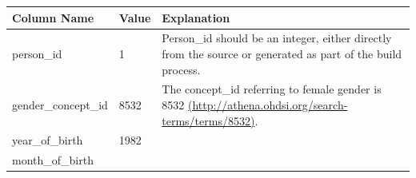 \documentclass[]{book}
\begin{document}
\begin{longtable}[]{@{}lll@{}}
\toprule
\begin{minipage}[b]{0.33\columnwidth}\raggedright
Column Name\strut
\end{minipage} & \begin{minipage}[b]{0.15\columnwidth}\raggedright
Value\strut
\end{minipage} & \begin{minipage}[b]{0.43\columnwidth}\raggedright
Explanation\strut
\end{minipage}\tabularnewline
\midrule
\endhead
\begin{minipage}[t]{0.33\columnwidth}\raggedright
person\_id\strut
\end{minipage} & \begin{minipage}[t]{0.15\columnwidth}\raggedright
1\strut
\end{minipage} & \begin{minipage}[t]{0.43\columnwidth}\raggedright
Person\_id should be an integer, either directly from the source or generated as part of the build process.\strut
\end{minipage}\tabularnewline
\begin{minipage}[t]{0.33\columnwidth}\raggedright
gender\_concept\_id\strut
\end{minipage} & \begin{minipage}[t]{0.15\columnwidth}\raggedright
8532\strut
\end{minipage} & \begin{minipage}[t]{0.43\columnwidth}\raggedright
The concept\_id referring to female gender is 8532 \href{http://athena.ohdsi.org/search-terms/terms/8532}{(http://athena.ohdsi.org/search-terms/terms/8532)}.\strut
\end{minipage}\tabularnewline
\begin{minipage}[t]{0.33\columnwidth}\raggedright
year\_of\_birth\strut
\end{minipage} & \begin{minipage}[t]{0.15\columnwidth}\raggedright
1982\strut
\end{minipage} & \begin{minipage}[t]{0.43\columnwidth}\raggedright
\strut
\end{minipage}\tabularnewline
\begin{minipage}[t]{0.33\columnwidth}\raggedright
month\_of\_birth\strut
\end{minipage} & \begin{minipage}[t]{0.15\columnwidth}\raggedright

\end{minipage}
\end{longtable}
\end{document}
